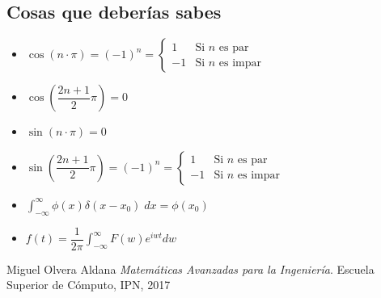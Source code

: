 \documentclass[12pt, fleqn]{report}                             %
\newcommand{\Wrap}[1]{\left( #1 \right)}                        %
\newcommand{\Cos}[1]{\cos\Wrap{#1}}                             %
\newcommand{\Sin}[1]{\sin\Wrap{#1}}                             %
\begin{document}
            \clearpage
            \subsection*{Cosas que deberías sabes}
                \begin{itemize}
                    \item
                        $
                            \Cos{n \cdot \pi} 
                            =
                            (-1)^n  
                            =
                            \begin{cases}
                                1 & \text{Si $n$ es par}      \\
                                -1 & \text{Si $n$ es impar}
                            \end{cases} 
                        $                        

                    \item $\Cos{\dfrac{2n+1}{2} \pi } = 0$

                    \item $\Sin{n \cdot \pi} = 0$

                    \item
                        $
                            \Sin{\dfrac{2n+1}{2} \pi }
                            =
                            (-1)^n  
                            =
                            \begin{cases}
                                1 & \text{Si $n$ es par}      \\
                                -1 & \text{Si $n$ es impar}
                            \end{cases}
                        $
                    \item $\displaystyle \int_{-\infty}^\infty \phi(x) \delta(x-x_0) \; dx = \phi(x_0)$
                    \item $f(t) = \dfrac{1}{2\pi} \int_{-\infty}^\infty F(w) e^{iw t} dw$
                \end{itemize}







\begin{thebibliography}{10}

        Miguel Olvera Aldana
        \textit{Matemáticas Avanzadas para la Ingeniería}. 
        Escuela Superior de Cómputo, IPN, 2017

\end{thebibliography}
\end{document}
